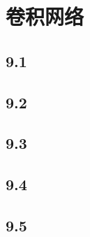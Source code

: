 \chapter{卷积网络}
\label{chap:9}
\section{9.1}
\label{sec:9.1}
\section{9.2}
\label{sec:9.2}
\section{9.3}
\label{sec:9.3}
\section{9.4}
\label{sec:9.4}
\section{9.5}
\label{sec:9.5}